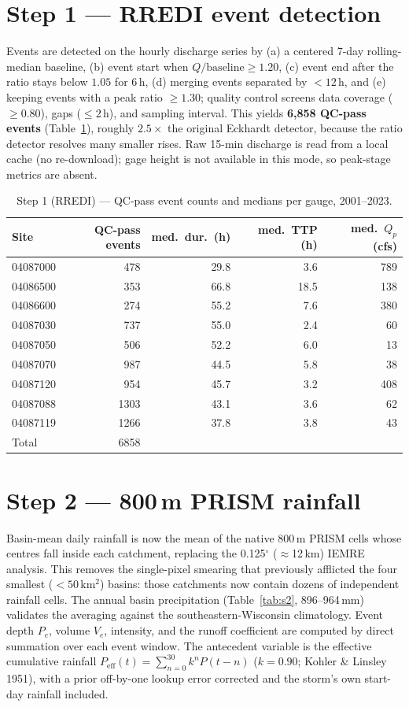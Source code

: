 \documentclass[11pt]{article}
\begin{document}
\section{Step 1 --- RREDI event detection}
Events are detected on the hourly discharge series by (a) a centered 7-day rolling-median
baseline, (b) event start when $Q/\text{baseline}\ge1.20$, (c) event end after the ratio stays
below $1.05$ for 6\,h, (d) merging events separated by $<12$\,h, and (e) keeping events with a
peak ratio $\ge1.30$; quality control screens data coverage ($\ge0.80$), gaps ($\le2$\,h), and
sampling interval. This yields \textbf{6{,}858 QC-pass events} (Table~\ref{tab:s1}), roughly
$2.5\times$ the original Eckhardt detector, because the ratio detector resolves many smaller
rises. Raw 15-min discharge is read from a local cache (no re-download); gage height is not
available in this mode, so peak-stage metrics are absent.

\begin{table}[htbp]\centering
\caption{Step 1 (RREDI) --- QC-pass event counts and medians per gauge, 2001--2023.}
\label{tab:s1}\small
\begin{tabular}{lrrrr}
\toprule
Site & QC-pass events & med.\ dur.\ (h) & med.\ TTP (h) & med.\ $Q_p$ (cfs) \\
\midrule
04087000 & 478  & 29.8 & 3.6  & 789 \\
04086500 & 353  & 66.8 & 18.5 & 138 \\
04086600 & 274  & 55.2 & 7.6  & 380 \\
04087030 & 737  & 55.0 & 2.4  & 60  \\
04087050 & 506  & 52.2 & 6.0  & 13  \\
04087070 & 987  & 44.5 & 5.8  & 38  \\
04087120 & 954  & 45.7 & 3.2  & 408 \\
04087088 & 1303 & 43.1 & 3.6  & 62  \\
04087119 & 1266 & 37.8 & 3.8  & 43  \\
\midrule
Total    & 6858 & & & \\
\bottomrule
\end{tabular}
\end{table}

\section{Step 2 --- 800\,m PRISM rainfall}
Basin-mean daily rainfall is now the mean of the native 800\,m PRISM cells whose centres fall
inside each catchment, replacing the 0.125$^{\circ}$ ($\approx$12\,km) IEMRE analysis. This
removes the single-pixel smearing that previously afflicted the four smallest ($<50$\,km$^2$)
basins: those catchments now contain dozens of independent rainfall cells. The annual basin
precipitation (Table~\ref{tab:s2}, 896--964\,mm) validates the averaging against the
southeastern-Wisconsin climatology. Event depth $P_e$, volume $V_e$, intensity, and the runoff
coefficient are computed by direct summation over each event window. The antecedent variable is
the effective cumulative rainfall $P_{\text{eff}}(t)=\sum_{n=0}^{30}k^nP(t-n)$ ($k=0.90$; Kohler
\& Linsley 1951), with a prior off-by-one lookup error corrected and the storm's own start-day
rainfall included.
\end{document}
